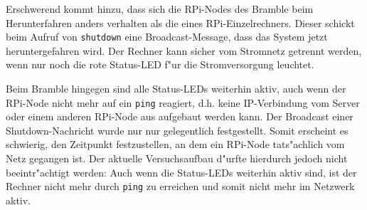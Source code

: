 \begin{enumerate}
Erschwerend kommt hinzu, dass sich die RPi-Nodes des Bramble beim Herunterfahren anders verhalten als die eines RPi-Einzelrechners. Dieser schickt beim Aufruf von \texttt{shutdown} eine Broadcast-Message, dass das System jetzt heruntergefahren wird. Der Rechner kann sicher vom Stromnetz getrennt werden, wenn nur noch die rote Status-LED f"ur die Stromversorgung leuchtet.  

Beim Bramble hingegen sind alle Status-LEDs weiterhin aktiv, auch wenn der RPi-Node nicht mehr auf ein \texttt{ping} reagiert, d.h. keine IP-Verbindung vom Server oder einem anderen RPi-Node aus aufgebaut werden kann. Der Broadcast einer Shutdown-Nachricht wurde nur nur gelegentlich festgestellt. Somit erscheint es schwierig, den Zeitpunkt festzustellen, an dem ein RPi-Node tats"achlich vom Netz gegangen ist. Der aktuelle Versuchsaufbau d"urfte hierdurch jedoch nicht beeintr"achtigt werden: Auch wenn die Status-LEDs weiterhin aktiv sind, ist der Rechner nicht mehr durch \texttt{ping} zu erreichen und somit nicht mehr im Netzwerk aktiv. 
\end{enumerate}
%
